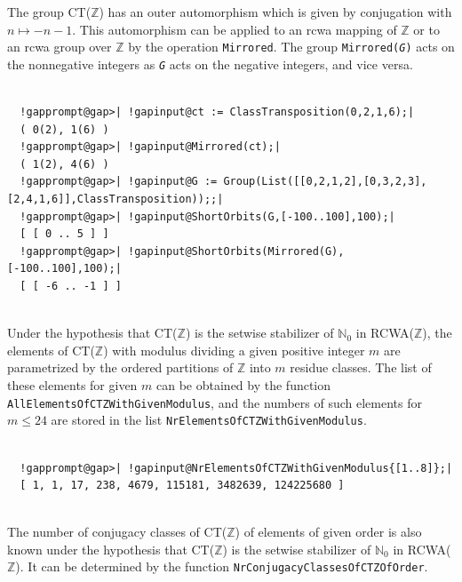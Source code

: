 \documentclass[a4paper,11pt]{report}
\begin{document}
{{{\begin{Verbatim}[commandchars=!@|,fontsize=\small,frame=single,label=Example]
\end{Verbatim}
 }

  The group CT({\ensuremath{\mathbb Z}}) has an outer automorphism which is
given by conjugation with $n \mapsto -n - 1$. This automorphism can be applied to an rcwa mapping of {\ensuremath{\mathbb
Z}} or to an rcwa group over {\ensuremath{\mathbb Z}} by the operation \texttt{Mirrored}. The group \texttt{Mirrored(}\mbox{\texttt{\mdseries\slshape G}}\texttt{)} acts on the nonnegative integers as \mbox{\texttt{\mdseries\slshape G}} acts on the negative integers, and vice versa. 
\begin{Verbatim}[commandchars=!@|,fontsize=\small,frame=single,label=Example]
  
  !gapprompt@gap>| !gapinput@ct := ClassTransposition(0,2,1,6);|
  ( 0(2), 1(6) )
  !gapprompt@gap>| !gapinput@Mirrored(ct);|
  ( 1(2), 4(6) )
  !gapprompt@gap>| !gapinput@G := Group(List([[0,2,1,2],[0,3,2,3],[2,4,1,6]],ClassTransposition));;|
  !gapprompt@gap>| !gapinput@ShortOrbits(G,[-100..100],100);|
  [ [ 0 .. 5 ] ]
  !gapprompt@gap>| !gapinput@ShortOrbits(Mirrored(G),[-100..100],100);|
  [ [ -6 .. -1 ] ]
  
\end{Verbatim}
   Under the hypothesis that CT({\ensuremath{\mathbb Z}}) is the setwise
stabilizer of ${\ensuremath{\mathbb N}}_0$ in RCWA({\ensuremath{\mathbb Z}}), the elements of CT({\ensuremath{\mathbb
Z}}) with modulus dividing a given positive integer $m$ are parametrized by the ordered partitions of {\ensuremath{\mathbb Z}} into $m$ residue classes. The list of these elements for given $m$ can be obtained by the function \texttt{AllElementsOfCTZWithGivenModulus}, and the numbers of such elements for $m \leq 24$ are stored in the list \texttt{NrElementsOfCTZWithGivenModulus}. 
\begin{Verbatim}[commandchars=!@|,fontsize=\small,frame=single,label=Example]
  
  !gapprompt@gap>| !gapinput@NrElementsOfCTZWithGivenModulus{[1..8]};|
  [ 1, 1, 17, 238, 4679, 115181, 3482639, 124225680 ]
  
\end{Verbatim}
  The number of conjugacy classes of CT({\ensuremath{\mathbb Z}}) of elements of
given order is also known under the hypothesis that CT({\ensuremath{\mathbb
Z}}) is the setwise stabilizer of ${\ensuremath{\mathbb N}}_0$ in RCWA({\ensuremath{\mathbb Z}}). It can be determined by the function \texttt{NrConjugacyClassesOfCTZOfOrder}. }

}
\end{document}
